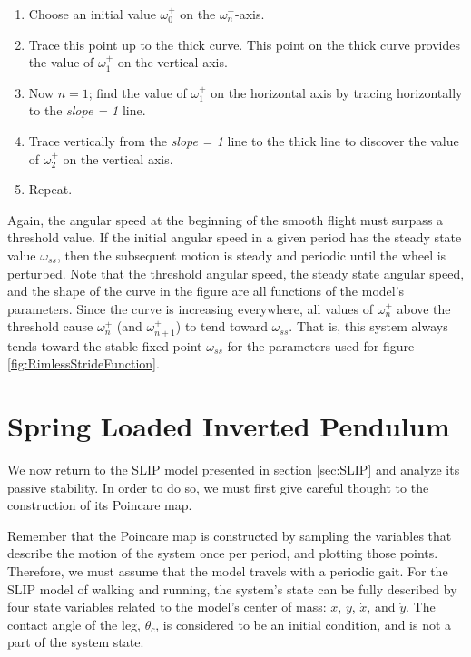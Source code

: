 \begin{enumerate}
\item Choose an initial value $\omega_{0}^{+}$ on the $\omega_{n}^{+}$-axis.
\item Trace this point up to the thick curve. This point on the thick curve provides the value of $\omega_{1}^{+}$ on the vertical axis.
\item Now $n = 1$; find the value of $\omega_{1}^{+}$ on the horizontal axis by
    tracing horizontally to the \textit{slope = 1} line.
\item Trace vertically from the \textit{slope = 1} line to the thick line to discover the value of $\omega_{2}^{+}$ on the vertical axis.
\item Repeat.
\end{enumerate}


Again, the angular speed at the beginning of the smooth flight must surpass a
threshold value. If the initial angular speed in a given period has the steady
state value $\omega_{ss}$, then the subsequent motion is steady and periodic
until the wheel is perturbed. Note that the threshold angular speed, the steady
state angular speed, and the shape of the curve in the figure are all functions
of the model's parameters. Since the curve is increasing everywhere, all values
of $\omega_n^+$ above the threshold cause $\omega_n^+$ (and $\omega_{n+1}^{+}$)
to tend toward $\omega_{ss}$. That is, this system always tends toward the
stable fixed point $\omega_{ss}$ for the parameters used for figure
\ref{fig:RimlessStrideFunction}.

\section{Spring Loaded Inverted Pendulum} %
\label{sec:SpringLoadedInvertedPendulum}

We now return to the SLIP model presented in section \ref{sec:SLIP} and analyze
its passive stability. In order to do so, we must first give careful thought to
the construction of its Poincare map.

Remember that the Poincare map is constructed by sampling the variables that
describe the motion of the system once per period, and plotting those points.
Therefore, we must assume that the model travels with a periodic gait. For the
SLIP model of walking and running, the system's state can be fully described by
four state variables related to the model's center of mass: $x$, $y$,
$\dot{x}$, and $\dot{y}$. The contact angle of the leg, $\theta_{c}$, is
considered to be an initial condition, and is not a part of the system state.

